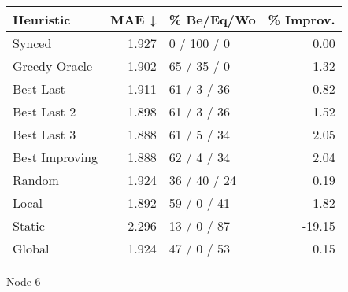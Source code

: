 \begin{tabular}{lrlr}
\toprule
\textbf{Heuristic} & \textbf{MAE ↓} & \textbf{\% Be/Eq/Wo} & \textbf{\% Improv.} \\
\midrule
            Synced &          1.927 &          0 / 100 / 0 &                0.00 \\
     Greedy Oracle &          1.902 &          65 / 35 / 0 &                1.32 \\
         Best Last &          1.911 &          61 / 3 / 36 &                0.82 \\
       Best Last 2 &          1.898 &          61 / 3 / 36 &                1.52 \\
       Best Last 3 &          1.888 &          61 / 5 / 34 &                2.05 \\
    Best Improving &          1.888 &          62 / 4 / 34 &                2.04 \\
            Random &          1.924 &         36 / 40 / 24 &                0.19 \\
             Local &          1.892 &          59 / 0 / 41 &                1.82 \\
            Static &          2.296 &          13 / 0 / 87 &              -19.15 \\
            Global &          1.924 &          47 / 0 / 53 &                0.15 \\
\bottomrule
\end{tabular}
\caption{Node 6}
\label{tab:ds_non_lr01_le1_bs4_6}
